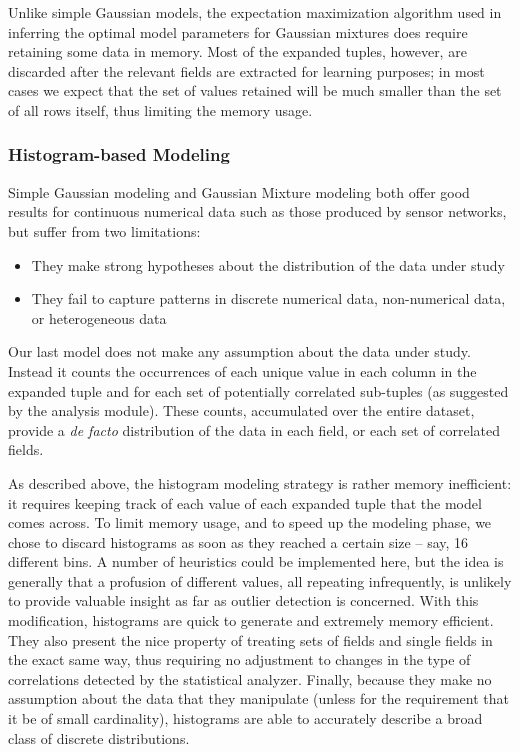 Unlike simple Gaussian models, the expectation maximization algorithm used in inferring the optimal model parameters for Gaussian mixtures does require retaining some data in memory. Most of the expanded tuples, however, are discarded after the relevant fields are extracted for learning purposes; in most cases we expect that the set of values retained will be much smaller than the set of all rows itself, thus limiting the memory usage.

\subsubsection{Histogram-based Modeling}
Simple Gaussian modeling and Gaussian Mixture modeling both offer good results for continuous numerical data such as those produced by sensor networks, but suffer from two limitations:

\begin{itemize}
\item They make strong hypotheses about the distribution of the data under study
\item They fail to capture patterns in discrete numerical data, non-numerical data, or heterogeneous data
\end{itemize}

Our last model does not make any assumption about the data under study. Instead it counts the occurrences of each unique value in each column in the expanded tuple and for each set of potentially correlated sub-tuples (as suggested by the analysis module). These counts, accumulated over the entire dataset, provide a \emph{de facto} distribution of the data in each field, or each set of correlated fields. 

As described above, the histogram modeling strategy is rather memory inefficient: it requires keeping track of each value of each expanded tuple that the model comes across. To limit memory usage, and to speed up the modeling phase, we chose to discard histograms as soon as they reached a certain size -- say, 16 different bins. A number of heuristics could be implemented here, but the idea is generally that a profusion of different values, all repeating infrequently, is unlikely to provide valuable insight as far as outlier detection is concerned. With this modification, histograms are quick to generate and extremely memory efficient. They also present the nice property of treating sets of fields and single fields in the exact same way, thus requiring no adjustment to changes in the type of correlations detected by the statistical analyzer. Finally, because they make no assumption about the data that they manipulate (unless for the requirement that it be of small cardinality), histograms are able to accurately describe a broad class of discrete distributions.

